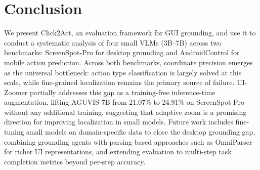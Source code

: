 \documentclass{article}
\theoremstyle{plain}
\theoremstyle{definition}
\theoremstyle{remark}
\begin{document}
\section{Conclusion}
We present Click2Act, an evaluation framework for GUI grounding, and use it
to conduct a systematic analysis of four small VLMs (3B--7B) across two benchmarks:
ScreenSpot-Pro for desktop grounding and AndroidControl for mobile action prediction.
Across both benchmarks, coordinate precision emerges as the universal bottleneck:
action type classification is largely solved at this scale, while fine-grained
localization remains the primary source of failure. UI-Zoomer partially addresses
this gap as a training-free inference-time augmentation, lifting AGUVIS-7B from
21.07\% to 24.91\% on ScreenSpot-Pro without any additional training, suggesting
that adaptive zoom is a promising direction for improving localization in small models.
Future work includes fine-tuning small models on domain-specific data to close the
desktop grounding gap, combining grounding agents with parsing-based approaches such
as OmniParser for richer UI representations, and extending evaluation to multi-step
task completion metrics beyond per-step accuracy.








\end{document}
